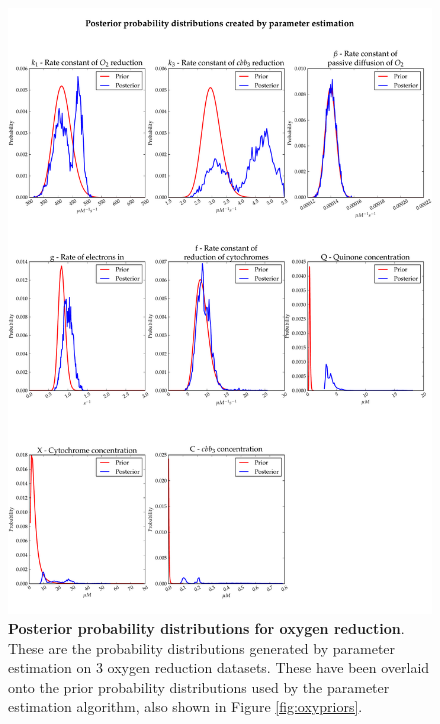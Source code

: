 \begin{figure}[p]
 \centering
 \includegraphics[width=15cm, trim=0cm 0cm 0cm 0cm]{./05-oxygenreduction/data/posteriors1.pdf}
 \caption[Posterior probability distributions for oxygen reduction]{{\bf Posterior probability distributions for oxygen reduction}. These are the probability distributions generated by parameter estimation on 3 oxygen reduction datasets. These have been overlaid onto the prior probability distributions used by the parameter estimation algorithm, also shown in Figure \ref{fig:oxypriors}.
 \label{fig:oxyposteriors}}
\end{figure}
\afterpage{\clearpage}

